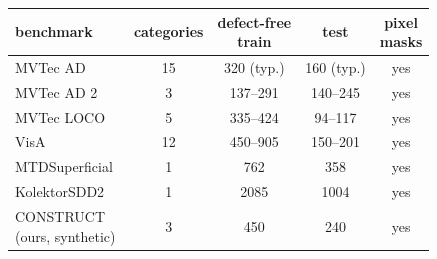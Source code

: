 \setlength{\tabcolsep}{3pt}
\begin{tabular}{@{}lcccc@{}}
\toprule
benchmark & categories & \shortstack{defect-free\\train} & test & \shortstack{pixel\\masks} \\
\midrule
MVTec AD~\cite{ref14} & 15 & 320 (typ.) & 160 (typ.) & yes \\
MVTec AD 2~\cite{ref19} & 3 & 137--291 & 140--245 & yes \\
MVTec LOCO~\cite{ref15} & 5 & 335--424 & 94--117 & yes \\
VisA~\cite{ref16} & 12 & 450--905 & 150--201 & yes \\
MTDSuperficial~\cite{ref18} & 1 & 762 & 358 & yes \\
KolektorSDD2~\cite{ref17} & 1 & 2085 & 1004 & yes \\
\shortstack[l]{CONSTRUCT\\(ours, synthetic)} & 3 & 450 & 240 & yes \\
\bottomrule
\end{tabular}
